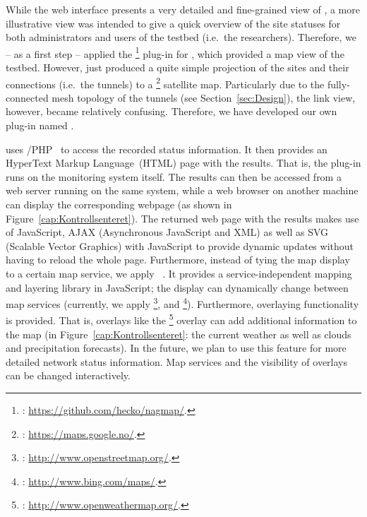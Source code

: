 While the web interface presents a very detailed and fine-grained view of , a more illustrative view was intended to give a quick overview of the site statuses for both administrators and users of the testbed (i.e.\ the researchers). Therefore, we -- as a first step -- applied the \footnote{: \url{https://github.com/hecko/nagmap/}.} plug-in for , which provided a map view of the  testbed. However,  just produced a quite simple projection of the sites and their connections (i.e.\ the tunnels) to a \footnote{: \url{https://maps.google.no/}.} satellite map. Particularly due to the fully-connected mesh topology of the tunnels (see Section~\ref{sec:Design}), the link view, however, became relatively confusing. Therefore, we have developed our own plug-in named .

 uses /PHP~\cite{ApacheDoc} to access the recorded  status information. It then provides an HyperText Markup Language~(HTML) page with the results. That is, the plug-in runs on the monitoring system itself. The results can then be accessed from a web server running on the same system, while a web browser on another machine can display the corresponding webpage (as shown in Figure~\ref{cap:Kontrollsenteret}). The returned web page with the results makes use of JavaScript, AJAX (Asynchronous JavaScript and XML) as well as SVG (Scalable Vector Graphics) with JavaScript to provide dynamic updates without having to reload the whole page. Furthermore, instead of tying the map display to a certain map service, we apply ~\cite{OpenLayersDoc}. It provides a service-independent mapping and layering library in JavaScript; the display can dynamically change between map services (currently, we apply 
\footnote{: \url{http://www.openstreetmap.org/}.},
 and
\footnote{: \url{http://www.bing.com/maps/}.}). Furthermore, overlaying functionality is provided. That is, overlays like the \footnote{: \url{http://www.openweathermap.org/}.} overlay can add additional information to the map (in Figure~\ref{cap:Kontrollsenteret}: the current weather as well as clouds and precipitation forecasts). In the future, we plan to use this feature for more detailed network status information. Map services and the visibility of overlays can be changed interactively.

